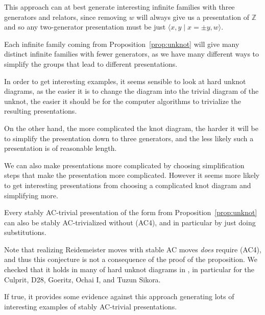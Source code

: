 \begin{remark}
This approach can at best generate interesting infinite families with three generators and relators, since removing $w$ will always give us a presentation of $\mathbb{Z}$ and so any two-generator presentation must be just $\langle x,y \mid x=\pm y, w\rangle$. 
\end{remark}
\begin{remark}
    Each infinite family coming from Proposition~\ref{prop:unknot} will give many distinct infinite families with fewer generators, as we have many different ways to simplify the groups that lead to different presentations. 
\end{remark}
\begin{remark}
    In order to get interesting examples, it seems sensible to look at hard unknot diagrams, as the easier it is to change the diagram into the trivial diagram of the unknot, the easier it should be for the computer algorithms to trivialize the resulting presentations. 
\end{remark}
\begin{remark} 
    On the other hand, the more complicated the knot diagram, the harder it will be to simplify the presentation down to three generators, and the less likely such a presentation is of reasonable length. 
\end{remark}
\begin{remark}
    We can also make presentations more complicated by choosing simplification steps that make the presentation more complicated. However it seems more likely to get interesting presentations from choosing a complicated knot diagram and simplifying more.  
\end{remark}

\begin{conjecture}
    Every stably AC-trivial presentation of the form from Proposition~\ref{prop:unknot} can also be stably AC-trivialized without (AC4), and in particular by just doing substitutions. 
\end{conjecture}

Note that realizing Reidemeister moves with stable AC moves \emph{does} require (AC4), and thus this conjecture is not a consequence of the proof of the proposition. We checked that it holds in many of hard unknot diagrams in \cite{burton2021harddiagramsunknot}, in particular for the Culprit, D28, Goeritz, Ochai I, and Tuzun Sikora. 

If true, it provides some evidence against this approach generating lots of interesting examples of stably AC-trivial presentations. 
